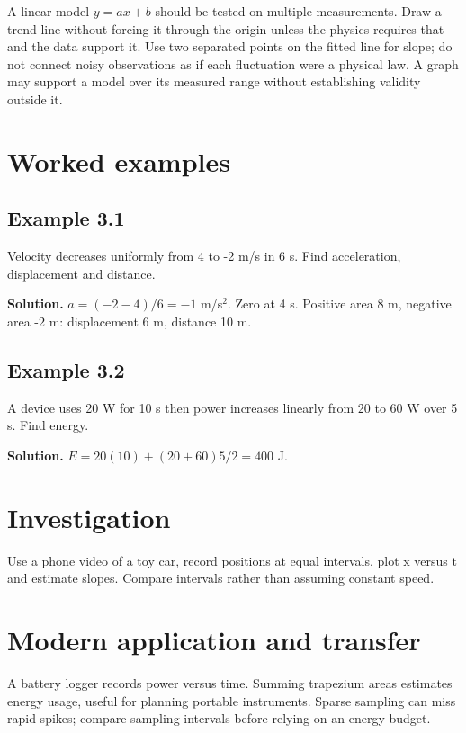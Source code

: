 \documentclass[11pt,a4paper,openany]{book}
\begin{document}
A linear model $y=ax+b$ should be tested on multiple measurements. Draw a trend line without forcing it through the origin unless the physics requires that and the data support it. Use two separated points on the fitted line for slope; do not connect noisy observations as if each fluctuation were a physical law. A graph may support a model over its measured range without establishing validity outside it.
\begin{center}
\end{center}
\section{Worked examples}
\subsection*{Example 3.1}
Velocity decreases uniformly from 4 to -2 m/s in 6 s. Find acceleration, displacement and distance.

\textbf{Solution.} $a=(-2-4)/6=-1$ m/s$^2$. Zero at 4 s. Positive area 8 m, negative area -2 m: displacement 6 m, distance 10 m.
\subsection*{Example 3.2}
A device uses 20 W for 10 s then power increases linearly from 20 to 60 W over 5 s. Find energy.

\textbf{Solution.} $E=20(10)+(20+60)5/2=400$ J.
\section{Investigation}
Use a phone video of a toy car, record positions at equal intervals, plot x versus t and estimate slopes. Compare intervals rather than assuming constant speed.
\section{Modern application and transfer}
A battery logger records power versus time. Summing trapezium areas estimates energy usage, useful for planning portable instruments. Sparse sampling can miss rapid spikes; compare sampling intervals before relying on an energy budget.
\end{document}
